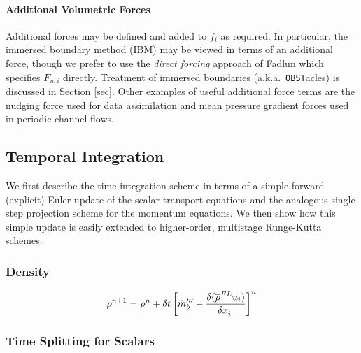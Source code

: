 \documentclass[11pt]{article}
\begin{document}
\paragraph{Additional Volumetric Forces} Additional forces may be defined and added to $f_i$ as required.  In particular, the immersed boundary method (IBM) may be viewed in terms of an additional force, though we prefer to use the \emph{direct forcing} approach of Fadlun \cite{Fadlun} which specifies $F_{u,i}$ directly. Treatment of immersed boundaries (a.k.a.~{\tt OBST}acles) is discussed in Section \ref{sec}.  Other examples of useful additional force terms are the nudging force used for data assimilation and mean pressure gradient forces used in periodic channel flows.






\subsection{Temporal Integration}

We first describe the time integration scheme in terms of a simple forward (explicit) Euler update of the scalar transport equations and the analogous single step projection scheme for the momentum equations.  We then show how this simple update is easily extended to higher-order, multistage Runge-Kutta schemes.

\subsubsection{Density}

\begin{equation}
\label{eqn_densityupdate}
\rho^{n+1} = \rho^n + \delta t \left[\dot{m}_b^{\prime\prime\prime} - \frac{\delta (\overline{\rho}^{FL} u_i)}{\delta x_i^{\scriptscriptstyle -}} \right]^n
\end{equation}

\subsubsection{Time Splitting for Scalars}
\end{document}
